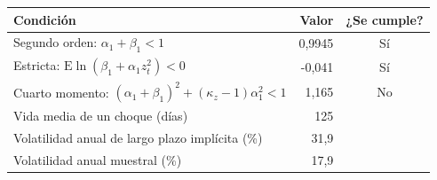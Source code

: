 \begin{tabular}{lrc}
\toprule
Condición & Valor & ¿Se cumple? \\
\midrule
Segundo orden: $\alpha_1+\beta_1<1$ & 0{,}9945 & Sí \\
Estricta: $\mathrm{E}\ln(\beta_1+\alpha_1 z_t^2)<0$ & -0{,}041 & Sí \\
Cuarto momento: $(\alpha_1+\beta_1)^2+(\kappa_z-1)\alpha_1^2<1$ & 1{,}165 & No \\
\midrule
Vida media de un choque (días) & 125 & \\
Volatilidad anual de largo plazo implícita (\%) & 31{,}9 & \\
Volatilidad anual muestral (\%) & 17{,}9 & \\
\bottomrule
\end{tabular}
